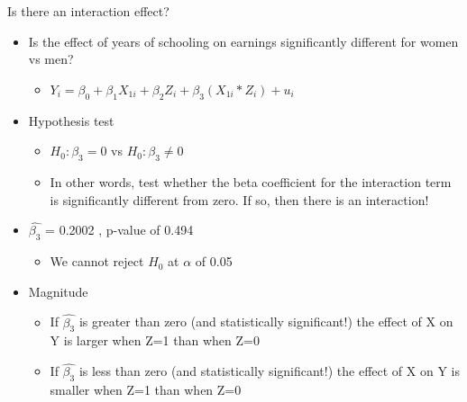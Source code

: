 \documentclass[8pt,ignorenonframetext,dvipsnames]{beamer}
\providecommand{\tightlist}{%
  \setlength{\itemsep}{0pt}\setlength{\parskip}{0pt}}
\let\olditem\item
\renewcommand{\item}{%
  \olditem\vspace{4pt}
}
\begin{document}
\begin{frame}{Is there an interaction effect?}
\protect\hypertarget{is-there-an-interaction-effect}{}

\begin{itemize}
\tightlist
\item
  Is the effect of years of schooling on earnings significantly
  different for women vs men?

  \begin{itemize}
  \tightlist
  \item
    \(Y_i = \beta_0 + \beta_1X_{1i} + \beta_2Z_{i} + \beta_3(X_{1i}*Z_{i}) + u_i\)
  \end{itemize}
\item
  Hypothesis test

  \begin{itemize}
  \tightlist
  \item
    \(H_0: \beta_3 =0\) vs \(H_0: \beta_3 \ne 0\)
  \item
    In other words, test whether the beta coefficient for the
    interaction term is significantly different from zero. If so, then
    there is an interaction!
  \end{itemize}
\item
  \(\hat{\beta_3}\) = 0.2002 , p-value of 0.494

  \begin{itemize}
  \tightlist
  \item
    We cannot reject \(H_0\) at \(\alpha\) of 0.05
  \end{itemize}
\item
  Magnitude

  \begin{itemize}
  \tightlist
  \item
    If \(\hat{\beta_3}\) is greater than zero (and statistically
    significant!) the effect of X on Y is larger when Z=1 than when Z=0
  \item
    If \(\hat{\beta_3}\) is less than zero (and statistically
    significant!) the effect of X on Y is smaller when Z=1 than when Z=0
  \end{itemize}
\end{itemize}

\end{frame}
\end{document}
